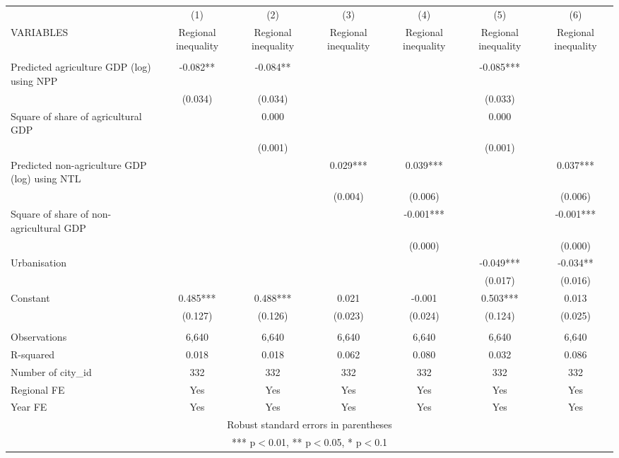 \documentclass[]{article}
\begin{document}
\begin{tabular}{lcccccc} \hline
 & (1) & (2) & (3) & (4) & (5) & (6) \\
VARIABLES & Regional inequality & Regional inequality & Regional inequality & Regional inequality & Regional inequality & Regional inequality \\ \hline
 &  &  &  &  &  &  \\
Predicted agriculture GDP (log) using NPP & -0.082** & -0.084** &  &  & -0.085*** &  \\
 & (0.034) & (0.034) &  &  & (0.033) &  \\
Square of share of agricultural GDP &  & 0.000 &  &  & 0.000 &  \\
 &  & (0.001) &  &  & (0.001) &  \\
Predicted non-agriculture GDP (log) using NTL &  &  & 0.029*** & 0.039*** &  & 0.037*** \\
 &  &  & (0.004) & (0.006) &  & (0.006) \\
Square of share of non-agricultural GDP &  &  &  & -0.001*** &  & -0.001*** \\
 &  &  &  & (0.000) &  & (0.000) \\
Urbanisation &  &  &  &  & -0.049*** & -0.034** \\
 &  &  &  &  & (0.017) & (0.016) \\
Constant & 0.485*** & 0.488*** & 0.021 & -0.001 & 0.503*** & 0.013 \\
 & (0.127) & (0.126) & (0.023) & (0.024) & (0.124) & (0.025) \\
 &  &  &  &  &  &  \\
Observations & 6,640 & 6,640 & 6,640 & 6,640 & 6,640 & 6,640 \\
R-squared & 0.018 & 0.018 & 0.062 & 0.080 & 0.032 & 0.086 \\
Number of city\_id & 332 & 332 & 332 & 332 & 332 & 332 \\
Regional FE & Yes & Yes & Yes & Yes & Yes & Yes \\
 Year FE & Yes & Yes & Yes & Yes & Yes & Yes \\ \hline
\multicolumn{7}{c}{ Robust standard errors in parentheses} \\
\multicolumn{7}{c}{ *** p$<$0.01, ** p$<$0.05, * p$<$0.1} \\
\end{tabular}
\end{document}
